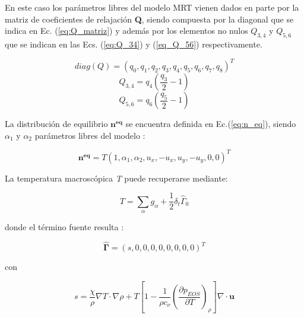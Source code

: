 En este caso los parámetros libres del modelo MRT vienen dados en parte por la matriz de coeficientes de relajación \textbf{Q}, siendo compuesta por la diagonal que se indica en Ec. (\ref{eq:Q_matriz}) y además por los elementos no nulos $Q_{3,4}$ y $ Q_{5,6}$ que se indican en las Ecs. (\ref{eq:Q_34}) y (\ref{eq_Q_56})  respectivamente.

\begin{equation}
    \textit{diag} (Q) = {( q_{0} , q_{1} , q_{2} , q_{3} , q_{4} , q_{5} , q_{6} , q_{7} , q_{8} )}^{T}
    \label{eq:Q_matriz}
\end{equation}
\begin{equation}
    Q_{3,4} = q_{4} \left( \frac{q_{3}}{2} - 1 \right)
    \label{eq:Q_34}
\end{equation}
\begin{equation}
    Q_{5,6} = q_{6} \left( \frac{q_{5}}{2} - 1 \right)
    \label{eq_Q_56}
\end{equation}

La distribución de equilibrio $\mathbf{n^{eq}}$ se encuentra definida en Ec.(\ref{eq:n_eq}), siendo $\alpha_{1}$ y $\alpha_{2}$ parámetros libres del modelo :

\begin{equation}
    \mathbf{n^{eq}} = T { \left( 1, \alpha_{1}, \alpha_{2}, u_{x}, -u_{x}, u_{y}, -u_{y}, 0, 0 \right) }^{T}
    \label{eq:n_eq}
\end{equation}

La temperatura macroscópica \textit{T} puede recuperarse mediante:

\begin{equation}
T = \sum_{\alpha} g_{\alpha} + \frac{1}{2} \delta_{t} {\hat{\Gamma}}_{0}
\label{eq:temperatura}
\end{equation}



donde el término fuente resulta :


\begin{equation}
    \mathbf{\hat{\Gamma}} = {( s, 0, 0, 0, 0, 0, 0, 0, 0 )}^{T}
\end{equation}

con 

\begin{equation}
    s = \frac{\chi}{\rho} \nabla T \cdot \nabla \rho + T \left[ 1 - \frac{1}{\rho c_{\nu}} {\left( \frac{\partial p_{EOS}}{\partial T} \right)}_{\rho} \right] \nabla \cdot \mathbf{u}
    \label{eq:s_chica}
\end{equation}

